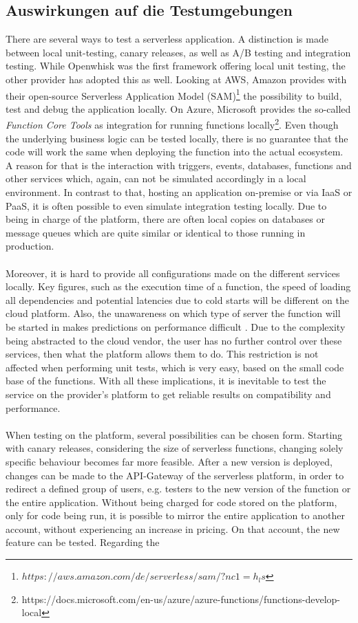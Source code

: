 \documentclass[11pt]{article}
\begin{document}
\subsection{Auswirkungen auf die Testumgebungen}
There are several ways to test a serverless application. A distinction is made between local unit-testing, canary releases, as well as A/B testing and integration testing. While Openwhisk was the first framework offering local unit testing, the other provider has adopted this as well. Looking at AWS, Amazon provides with their open-source Serverless Application Model (SAM)\footnote{$https://aws.amazon.com/de/serverless/sam/?nc1=h_ls$} the possibility to build, test and debug the application locally. On Azure, Microsoft provides the so-called \textit{Function Core Tools} as integration for running functions locally\footnote{https://docs.microsoft.com/en-us/azure/azure-functions/functions-develop-local}. Even though the underlying business logic can be tested locally, there is no guarantee that the code will work the same when deploying the function into the actual ecosystem. A reason for that is the interaction with triggers, events, databases, functions and other services which, again, can not be simulated accordingly in a local environment. In contrast to that, hosting an application on-premise or via IaaS or PaaS, it is often possible to even simulate integration testing locally. Due to being in charge of the platform, there are often local copies on databases or message queues which are quite similar or identical to those running in production.\\\\ Moreover, it is hard to provide all configurations made on the different services locally. Key figures, such as the execution time of a function, the speed of loading all dependencies and potential latencies due to cold starts will be different on the cloud platform. Also, the unawareness on which type of server the function will be started in makes predictions on performance difficult \cite{racicot2019quality}. Due to the complexity being abstracted to the cloud vendor, the user has no further control over these services, then what the platform allows them to do. This restriction is not affected when performing unit tests, which is very easy, based on the small code base of the functions. With all these implications, it is inevitable to test the service on the provider's platform to get reliable results on compatibility and performance.\\\\ When testing on the platform, several possibilities can be chosen form. Starting with canary releases, considering the size of serverless functions, changing solely specific behaviour becomes far more feasible. After a new version is deployed, changes can be made to the API-Gateway of the serverless platform, in order to redirect a defined group of users, e.g. testers to the new version of the function or the entire application.  Without being charged for code stored on the platform, only for code being run, it is possible to mirror the entire application to another account, without experiencing an increase in pricing. On that account, the new feature can be tested. Regarding the 
\end{document}
